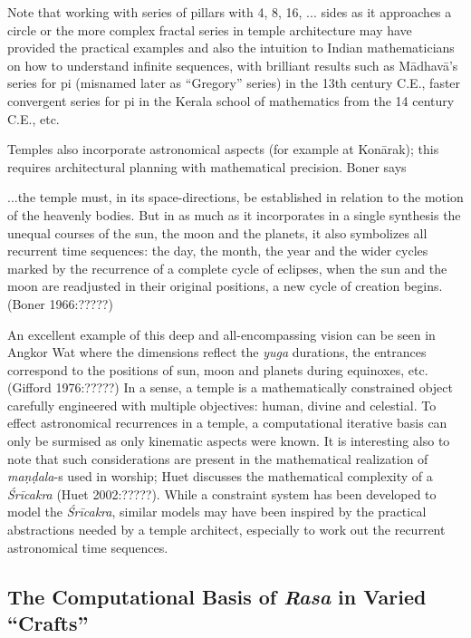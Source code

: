 Note that working with series of pillars with 4, 8, 16, ... sides as it approaches a circle or the more complex fractal series in temple architecture may have provided the practical examples and also the intuition to Indian mathematicians on how to understand infinite sequences, with brilliant results such as Mādhavā’s series for pi (misnamed later as “Gregory” series) in the 13th century C.E., faster convergent series for pi in the Kerala school of mathematics from the 14 century C.E., etc.

Temples also incorporate astronomical aspects (for example at Konārak); this requires architectural planning with mathematical precision. Boner says 

\begin{myquote}
...the temple must, in its space-directions, be established in relation to the motion of the heavenly bodies. But in as much as it incorporates in a single synthesis the unequal courses of the sun, the moon and the planets, it also symbolizes all recurrent time sequences: the day, the month, the year and the wider cycles marked by the recurrence of a complete cycle of eclipses, when the sun and the moon are readjusted in their original positions, a new cycle of creation begins. 
\hfill(Boner 1966:?????)
\end{myquote}

An excellent example of this deep and all-encompassing vision can be seen in Angkor Wat where the dimensions reflect the \textsl{yuga} durations, the entrances correspond to the positions of sun, moon and planets during equinoxes, etc. (Gifford 1976:?????) In a sense, a temple is a mathematically constrained object carefully engineered with multiple objectives: human, divine and celestial. To effect astronomical recurrences in a temple, a computational iterative basis can only be surmised as only kinematic aspects were known. It is interesting also to note that such considerations are present in the mathematical realization of \textsl{maṇḍala}-s used in worship; Huet discusses the mathematical complexity of a \textsl{Śrīcakra} (Huet 2002:?????). While a constraint system has been developed to model the \textsl{Śrīcakra}, similar models may have been inspired by the practical abstractions needed by a temple architect, especially to work out the recurrent astronomical time sequences.\\[-20pt]

\subsection{The Computational Basis of \textsl{Rasa} in Varied “Crafts”}\label{chap3-sec5.4}

